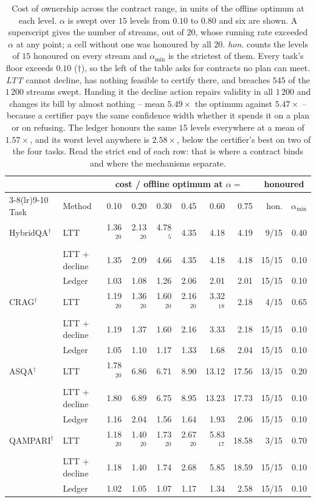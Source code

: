\begin{table}[t]
\centering
\caption{Cost of ownership across the contract range, in units of the offline optimum at each level. $\alpha$ is swept over $15$ levels from $0.10$ to $0.80$ and six are shown. A superscript gives the number of streams, out of $20$, whose running rate exceeded $\alpha$ at any point; a cell without one was honoured by all $20$. \emph{hon.} counts the levels of $15$ honoured on every stream and $\alpha_{\min}$ is the strictest of them. Every task's floor exceeds $0.10$ ($\dagger$), so the left of the table asks for contracts no plan can meet. \emph{LTT} cannot decline, has nothing feasible to certify there, and breaches $545$ of the $1\,200$ streams swept. Handing it the decline action repairs validity in all $1\,200$ and changes its bill by almost nothing -- mean $5.49\times$ the optimum against $5.47\times$ -- because a certifier pays the same confidence width whether it spends it on a plan or on refusing. The ledger honours the same $15$ levels everywhere at a mean of $1.57\times$, and its worst level anywhere is $2.58\times$, below the certifier's best on two of the four tasks. Read the strict end of each row: that is where a contract binds and where the mechanisms separate.}
\label{tab:sweep}
\footnotesize
\setlength{\tabcolsep}{4pt}
\begin{tabular}{llrrrrrrrr}
\toprule
 & & \multicolumn{6}{c}{cost / offline optimum at $\alpha=$} & \multicolumn{2}{c}{honoured} \\
\cmidrule(lr){3-8}\cmidrule(lr){9-10}
Task & Method & 0.10 & 0.20 & 0.30 & 0.45 & 0.60 & 0.75 & hon. & $\alpha_{\min}$ \\
\midrule
HybridQA$^\dagger$ & LTT & 1.36$^{20}$ & 2.13$^{20}$ & 4.78$^{5}$ & 4.35 & 4.18 & 4.19 & 9/15 & 0.40 \\
 & LTT + decline & 1.35 & 2.09 & 4.66 & 4.35 & 4.18 & 4.18 & 15/15 & 0.10 \\
 & Ledger & 1.03 & 1.08 & 1.26 & 2.06 & 2.01 & 2.01 & 15/15 & 0.10 \\
\addlinespace[2pt]
CRAG$^\dagger$ & LTT & 1.19$^{20}$ & 1.36$^{20}$ & 1.60$^{20}$ & 2.16$^{20}$ & 3.32$^{18}$ & 2.18 & 4/15 & 0.65 \\
 & LTT + decline & 1.19 & 1.37 & 1.60 & 2.16 & 3.33 & 2.18 & 15/15 & 0.10 \\
 & Ledger & 1.05 & 1.10 & 1.17 & 1.33 & 1.68 & 2.04 & 15/15 & 0.10 \\
\addlinespace[2pt]
ASQA$^\dagger$ & LTT & 1.78$^{20}$ & 6.86 & 6.71 & 8.90 & 13.12 & 17.56 & 13/15 & 0.20 \\
 & LTT + decline & 1.80 & 6.89 & 6.75 & 8.95 & 13.23 & 17.73 & 15/15 & 0.10 \\
 & Ledger & 1.16 & 2.04 & 1.56 & 1.64 & 1.93 & 2.06 & 15/15 & 0.10 \\
\addlinespace[2pt]
QAMPARI$^\dagger$ & LTT & 1.18$^{20}$ & 1.40$^{20}$ & 1.73$^{20}$ & 2.67$^{20}$ & 5.83$^{17}$ & 18.58 & 3/15 & 0.70 \\
 & LTT + decline & 1.18 & 1.40 & 1.74 & 2.68 & 5.85 & 18.59 & 15/15 & 0.10 \\
 & Ledger & 1.02 & 1.05 & 1.07 & 1.17 & 1.34 & 2.58 & 15/15 & 0.10 \\
\bottomrule
\end{tabular}
\end{table}
